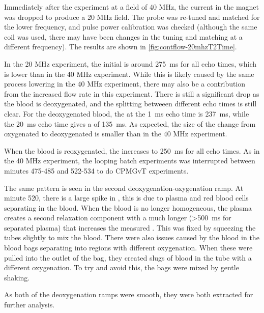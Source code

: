 Immediately after the experiment at a field of 40 MHz, the current in the magnet was dropped to produce a 20 MHz field.
The probe was re-tuned and matched for the lower frequency, and pulse power calibration was checked (although the same coil was used, there may have been changes in the tuning and matching at a different frequency).
The results are shown in \autoref{fig:contflow-20mhzT2Time}.

In the 20 MHz experiment, the initial \Ttwo is around \SI{275}{ms} for all echo times, which is lower than in the 40 MHz experiment.
While this is likely caused by the same process lowering \Ttwo in the 40 MHz experiment, there may also be a contribution from the increased flow rate in this experiment.
There is still a significant drop as the blood is deoxygenated, and the splitting betweeen different echo times is still clear.
For the deoxygenated blood, the \Ttwo at the \SI{1}{ms} echo time is \SI{237}{ms}, while the \SI{20}{ms} echo time gives a \Ttwo of \SI{135}{ms}.
As expected, the size of the change from oxygenated to deoxygenated is smaller than in the 40 MHz experiment.

When the blood is reoxygenated, the \Ttwo increases to \SI{250}{ms} for all echo times.
As in the 40 MHz experiment, the looping batch experiments was interrupted between minutes 475-485 and 522-534 to do CPMGvT experiments.

The same pattern is seen in the second deoxygenation-oxygenation ramp.
At minute 520, there is a large spike in \Ttwo, this is due to plasma and red blood cells separating in the blood.
When the blood is no longer homogeneous, the plasma creates a second relaxation component with a much longer \Ttwo (\SI{>500}{ms} for separated plasma) that increases the measured \Ttwo.
This was fixed by squeezing the tubes slightly to mix the blood.
There were also issues caused by the blood in the blood bags separating into regions with different oxygenation.
When these were pulled into the outlet of the bag, they created slugs of blood in the tube with a different oxygenation.
To try and avoid this, the bags were mixed by gentle shaking.

As both of the deoxygenation ramps were smooth, they were both extracted for further analysis.

